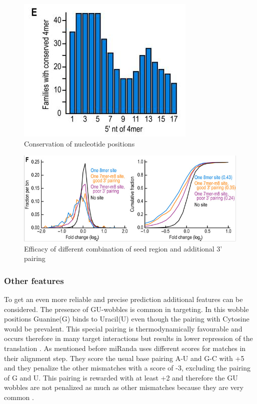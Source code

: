 \documentclass[12pt]{article}
\begin{document}
\begin{figure}
\centering
\includegraphics[scale=0.5]{results/sites_conserved.PNG} 
\caption{Conservation of nucleotide positions}
\label{conserved}
\end{figure}

\begin{figure}
\centering
\includegraphics[scale=0.5]{results/site_efficacy.PNG} 
\caption{Efficacy of different combination of seed region and additional 3' pairing}
\label{efficacy}
\end{figure}



\subsubsection{Other features}
To get an even more reliable and precise prediction additional features can be considered. The presence of GU-wobbles is common in targeting. In this wobble positions Guanine(G) binds to Uracil(U) even though the pairing with Cytosine would be prevalent. This special pairing is thermodynamically favourable and occurs therefore in many target interactions but results in lower repression of the translation \cite{Doench}. As mentioned before miRanda uses different scores for matches in their alignment step. They score the usual base pairing A-U and G-C with +5 and they penalize the other mismatches with a score of -3, excluding the pairing of G and U. This pairing is rewarded with at least +2 and therefore the GU wobbles are not penalized as much as other mismatches because they are very common \cite{Enright}.\\\\
 
\end{document}
